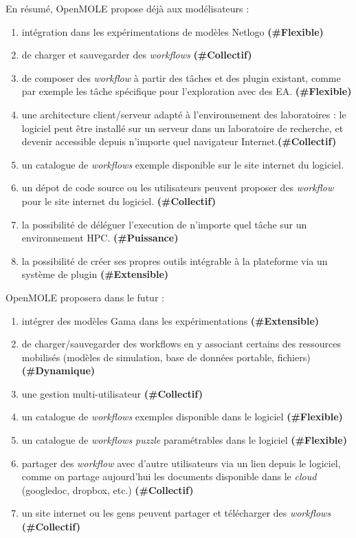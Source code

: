 En résumé, OpenMOLE propose déjà aux modélisateurs :  
\begin{enumerate}
\item intégration dans les expérimentations de modèles Netlogo \textbf{(\#Flexible)}
\item de charger et sauvegarder des \textit{workflows} \textbf{(\#Collectif)}
\item de composer des \textit{workflow} à partir des tâches et des plugin existant, comme par exemple les tâche spécifique pour l'exploration avec des EA. \textbf{(\#Flexible)}
\item une architecture client/serveur adapté à l'environnement des laboratoires : le logiciel peut être installé sur un serveur dans un laboratoire de recherche, et devenir accessible depuis n'importe quel navigateur Internet.\textbf{(\#Collectif)}   
\item un catalogue de \textit{workflows} exemple disponible sur le site internet du logiciel.
\item un dépot de code source ou les utilisateurs peuvent proposer des \textit{workflow} pour le site internet du logiciel. \textbf{(\#Collectif)}
\item la possibilité de déléguer l'execution de n'importe quel tâche sur un environnement HPC. \textbf{(\#Puissance)}
\item la possibilité de créer ses propres outils intégrable à la plateforme via un système de plugin \textbf{(\#Extensible)}
\end{enumerate}

OpenMOLE proposera dans le futur : 
\begin{enumerate}
\item intégrer des modèles Gama dans les expérimentations \textbf{(\#Extensible)}
\item de charger/sauvegarder des workflows en y associant certains des ressources mobilisés (modèles de simulation, base de données portable, fichiers) \textbf{(\#Dynamique)}
\item une gestion multi-utilisateur \textbf{(\#Collectif)}
\item un catalogue de \textit{workflows} exemples disponible dans le logiciel \textbf{(\#Flexible)}
\item un catalogue de \textit{workflows puzzle} paramétrables dans le logiciel \textbf{(\#Flexible)}
\item partager des \textit{workflow} avec d'autre utilisateurs via un lien depuis le logiciel, comme on partage aujourd'hui les documents disponible dans le \textit{cloud} (googledoc, dropbox, etc.)  \textbf{(\#Collectif)}
\item un site internet ou les gens peuvent partager et télécharger des \textit{workflows}  \textbf{(\#Collectif)}
\end{enumerate}

